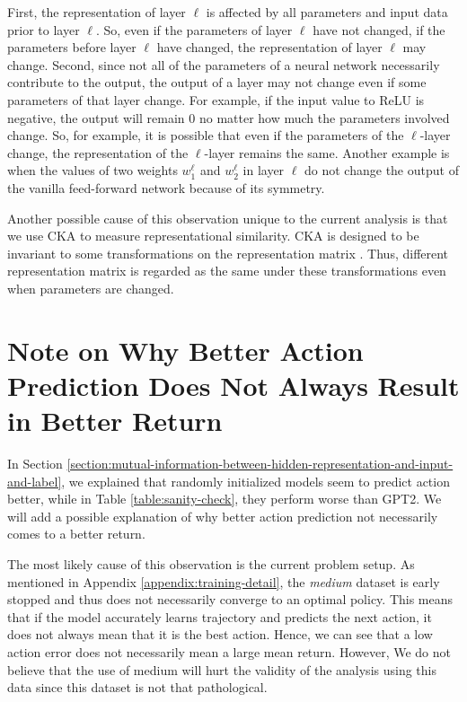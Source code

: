 \documentclass{article}
\begin{document}
First, the representation of layer $\ell$ is affected by all parameters and input data prior to layer $\ell$. So, even if the parameters of layer $\ell$ have not changed, if the parameters before layer $\ell$ have changed, the representation of layer $\ell$ may change. Second, since not all of the parameters of a neural network necessarily contribute to the output, the output of a layer may not change even if some parameters of that layer change. For example, if the input value to ReLU is negative, the output will remain 0 no matter how much the parameters involved change. So, for example, it is possible that even if the parameters of the $\ell$-layer change, the representation of the $\ell$-layer remains the same. Another example is when the values of two weights $w_1^\ell$ and $w_2^\ell$ in layer $\ell$ do not change the output of the vanilla feed-forward network because of its symmetry. 

Another possible cause of this observation unique to the current analysis is that we use CKA to measure representational similarity. CKA is designed to be invariant to some transformations on the representation matrix \cite{kornblith2019similarity}. Thus, different representation matrix is regarded as the same under these transformations even when parameters are changed.


\section{Note on Why Better Action Prediction Does Not Always Result in Better Return}
\label{appendix:note-on-why-better-action-prediction-not-always-result-in-better-return}

In Section \ref{section:mutual-information-between-hidden-representation-and-input-and-label}, we explained that randomly initialized models seem to predict action better, while in Table \ref{table:sanity-check}, they perform worse than GPT2. We will add a possible explanation of why better action prediction not necessarily comes to a better return.

The most likely cause of this observation is the current problem setup. As mentioned in Appendix \ref{appendix:training-detail}, the \textit{medium} dataset is early stopped and thus does not necessarily converge to an optimal policy. This means that if the model accurately learns trajectory and predicts the next action, it does not always mean that it is the best action. Hence, we can see that a low action error does not necessarily mean a large mean return. However, We do not believe that the use of medium will hurt the validity of the analysis using this data since this dataset is not that pathological.
\end{document}
